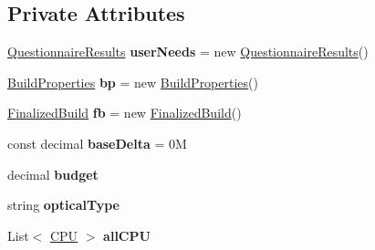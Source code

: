 \subsection*{Private Attributes}
\begin{DoxyCompactItemize}
\item 
\hyperlink{class_business_objects_1_1_questionnaire_results}{Questionnaire\+Results} {\bfseries user\+Needs} = new \hyperlink{class_business_objects_1_1_questionnaire_results}{Questionnaire\+Results}()\hypertarget{class_business_logic_1_1_build_processor_a31e8da8761b5685ab0c25c40019f0764}{}\label{class_business_logic_1_1_build_processor_a31e8da8761b5685ab0c25c40019f0764}

\item 
\hyperlink{class_business_objects_1_1_build_properties}{Build\+Properties} {\bfseries bp} = new \hyperlink{class_business_objects_1_1_build_properties}{Build\+Properties}()\hypertarget{class_business_logic_1_1_build_processor_ab744ddd81ec4a34f0392af4c559eff47}{}\label{class_business_logic_1_1_build_processor_ab744ddd81ec4a34f0392af4c559eff47}

\item 
\hyperlink{class_business_objects_1_1_finalized_build}{Finalized\+Build} {\bfseries fb} = new \hyperlink{class_business_objects_1_1_finalized_build}{Finalized\+Build}()\hypertarget{class_business_logic_1_1_build_processor_a427ec4e6cc78a30ecee4ca94a4427cdb}{}\label{class_business_logic_1_1_build_processor_a427ec4e6cc78a30ecee4ca94a4427cdb}

\item 
const decimal {\bfseries base\+Delta} = 0M\hypertarget{class_business_logic_1_1_build_processor_a7466ca238311159f16e9eb8661fa99bc}{}\label{class_business_logic_1_1_build_processor_a7466ca238311159f16e9eb8661fa99bc}

\item 
decimal {\bfseries budget}\hypertarget{class_business_logic_1_1_build_processor_af1ad16921df1a5ce1eab8c607ba5fca4}{}\label{class_business_logic_1_1_build_processor_af1ad16921df1a5ce1eab8c607ba5fca4}

\item 
string {\bfseries optical\+Type}\hypertarget{class_business_logic_1_1_build_processor_a6af40fa6fc37eccdc6e3286b03c7dcd2}{}\label{class_business_logic_1_1_build_processor_a6af40fa6fc37eccdc6e3286b03c7dcd2}

\item 
List$<$ \hyperlink{class_business_objects_1_1_c_p_u}{C\+PU} $>$ {\bfseries all\+C\+PU}\hypertarget{class_business_logic_1_1_build_processor_adae821c7ea289141aef0a8cf78ad7f40}{}\label{class_business_logic_1_1_build_processor_adae821c7ea289141aef0a8cf78ad7f40}


\end{DoxyCompactItemize}
